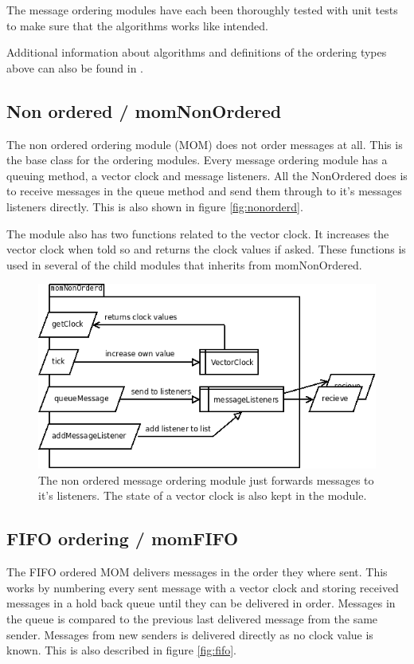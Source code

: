 \documentclass[english]{article}
\begin{document}
The message ordering modules have each been thoroughly tested with unit tests to make sure that the algorithms works like intended.

Additional information about algorithms and definitions of the ordering types above can also be found in \cite{distsys-ordering}.

\subsection{Non ordered / momNonOrdered}
The non ordered ordering module (MOM) does not order messages at all. This is the base class for the ordering modules. Every message ordering module has a queuing method, a vector clock and message listeners. All the NonOrdered does is to receive messages in the queue method and send them through to it's messages listeners directly. This is also shown in figure \vref{fig:nonorderd}.

The module also has two functions related to the vector clock. It increases the vector clock when told so and returns the clock values if asked. These functions is used in several of the child modules that inherits from momNonOrdered.

\begin{figure}
\includegraphics[width=\textwidth]{momNonOrderd.png}
\caption{The non ordered message ordering module just forwards messages to it's listeners. The state of a vector clock is also kept in the module.}
\label{fig:nonorderd}
\end{figure}

\subsection{FIFO ordering / momFIFO}
\label{mo-fifo}
The FIFO ordered MOM delivers messages in the order they where sent. This works by numbering every sent message with a vector clock and storing received messages in a hold back queue until they can be delivered in order. Messages in the queue is compared to the previous last delivered message from the same sender. Messages from new senders is delivered directly as no clock value is known. This is also described in figure \vref{fig:fifo}.
\end{document}
